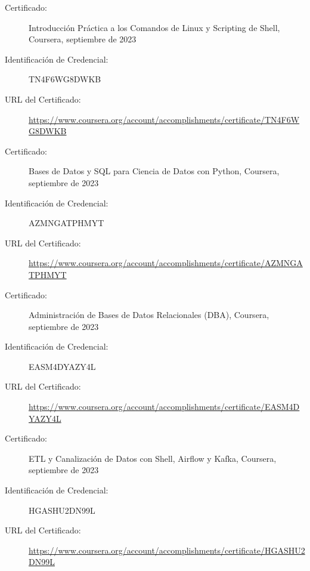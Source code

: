 \documentclass[a4paper,10pt]{article}
\begin{document}
\vspace{1pt} %

\begin{description}
    \item[Certificado:] Introducción Práctica a los Comandos de Linux y Scripting de Shell, Coursera, septiembre de 2023
    \item[Identificación de Credencial:] TN4F6WG8DWKB
    \item[URL del Certificado:] \url{https://www.coursera.org/account/accomplishments/certificate/TN4F6WG8DWKB}
\end{description}

\vspace{1pt} %

\begin{description}
    \item[Certificado:] Bases de Datos y SQL para Ciencia de Datos con Python, Coursera, septiembre de 2023
    \item[Identificación de Credencial:] AZMNGATPHMYT
    \item[URL del Certificado:] \url{https://www.coursera.org/account/accomplishments/certificate/AZMNGATPHMYT}
\end{description}

\vspace{1pt} %

\begin{description}
    \item[Certificado:] Administración de Bases de Datos Relacionales (DBA), Coursera, septiembre de 2023
    \item[Identificación de Credencial:] EASM4DYAZY4L
    \item[URL del Certificado:] \url{https://www.coursera.org/account/accomplishments/certificate/EASM4DYAZY4L}
\end{description}

\vspace{1pt} %

\begin{description}
    \item[Certificado:] ETL y Canalización de Datos con Shell, Airflow y Kafka, Coursera, septiembre de 2023
    \item[Identificación de Credencial:] HGASHU2DN99L
    \item[URL del Certificado:] \url{https://www.coursera.org/account/accomplishments/certificate/HGASHU2DN99L}
\end{description}
\end{document}
